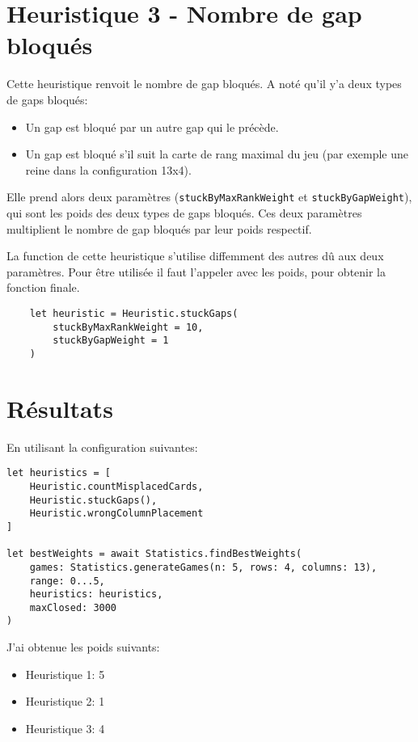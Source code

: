 \section{Heuristique 3 - Nombre de gap bloqués}
Cette heuristique renvoit le nombre de gap bloqués.
A noté qu'il y'a deux types de gaps bloqués:

\begin{itemize}
    \item Un gap est bloqué par un autre gap qui le précède.
    \item Un gap est bloqué s'il suit la carte de rang maximal du jeu (par exemple une reine dans la configuration 13x4).
\end{itemize}

Elle prend alors deux paramètres (\texttt{stuckByMaxRankWeight} et \texttt{stuckByGapWeight}), qui sont les poids des deux types de gaps bloqués. Ces deux paramètres multiplient le nombre de gap bloqués par leur poids respectif.

La function de cette heuristique s'utilise diffemment des autres dû aux deux paramètres. Pour être utilisée il faut l'appeler avec les poids, pour obtenir la fonction finale.
\begin{lstlisting}
    let heuristic = Heuristic.stuckGaps(
        stuckByMaxRankWeight = 10,
        stuckByGapWeight = 1
    )
\end{lstlisting}

\pagebreak

\section{Résultats}
En utilisant la configuration suivantes:
\begin{lstlisting}
let heuristics = [
    Heuristic.countMisplacedCards,
    Heuristic.stuckGaps(),
    Heuristic.wrongColumnPlacement
]

let bestWeights = await Statistics.findBestWeights(
    games: Statistics.generateGames(n: 5, rows: 4, columns: 13),
    range: 0...5,
    heuristics: heuristics,
    maxClosed: 3000
)
\end{lstlisting}

J'ai obtenue les poids suivants:
\begin{itemize}
    \item Heuristique 1: 5
    \item Heuristique 2: 1
    \item Heuristique 3: 4
\end{itemize}

